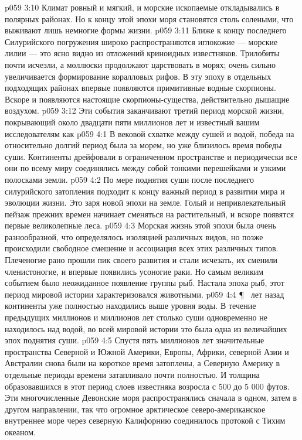 \vs p059 3:10 Климат ровный и мягкий, и морские ископаемые откладывались в полярных районах. Но к концу этой эпохи моря становятся столь солеными, что выживают лишь немногие формы жизни.
\vs p059 3:11 Ближе к концу последнего Силурийского погружения широко распространяются иглокожие --- морские лилии --- это ясно видно из отложений криноидных известняков. Трилобиты почти исчезли, а моллюски продолжают царствовать в морях; очень сильно увеличивается формирование коралловых рифов. В эту эпоху в отдельных подходящих районах впервые появляются примитивные водные скорпионы. Вскоре и  появляются настоящие скорпионы\hyp{}существа, действительно дышащие воздухом.
\vs p059 3:12 Эти события заканчивают третий период морской жизни, покрывающий около двадцати пяти миллионов лет и известный вашим исследователям как 
\vs p059 4:1 В вековой схватке между сушей и водой, победа на относительно долгий период была за морем, но уже близилось время победы суши. Континенты дрейфовали в ограниченном пространстве и периодически все они по всему миру соединялись между собой тонкими перешейками и узкими полосками земли.
\vs p059 4:2 По мере поднятия суши после последнего силурийского затопления подходит к концу важный период в развитии мира и эволюции жизни. Это заря новой эпохи на земле. Голый и непривлекательный пейзаж прежних времен начинает сменяться на растительный, и вскоре появятся первые великолепные леса.
\vs p059 4:3 Морская жизнь этой эпохи была очень разнообразной, что определялось изоляцией различных видов, но позже происходили свободное смешение и ассоциация всех этих различных типов. Плеченогие рано прошли пик своего развития и стали исчезать, их сменили членистоногие, и впервые появились усоногие раки. Но самым великим событием было неожиданное появление группы рыб. Настала эпоха рыб, этот период мировой истории характеризовался  животными.
\vs p059 4:4 \P\  лет назад континенты уже полностью находились выше уровня воды. В течение предыдущих миллионов и миллионов лет столько суши одновременно не находилось над водой, во всей мировой истории это была одна из величайших эпох поднятия суши.
\vs p059 4:5 Спустя пять миллионов лет значительные пространства Северной и Южной Америки, Европы, Африки, северной Азии и Австралии снова были на короткое время затоплены, а Северную Америку в отдельные периоды времени затапливало почти полностью. И толщина образовавшихся в этот период слоев известняка возросла с 500 до 5 000 футов. Эти многочисленные Девонские моря распространялись сначала в одном, затем в другом направлении, так что огромное арктическое северо\hyp{}американское внутреннее море через северную Калифорнию соединилось протокой с Тихим океаном.
